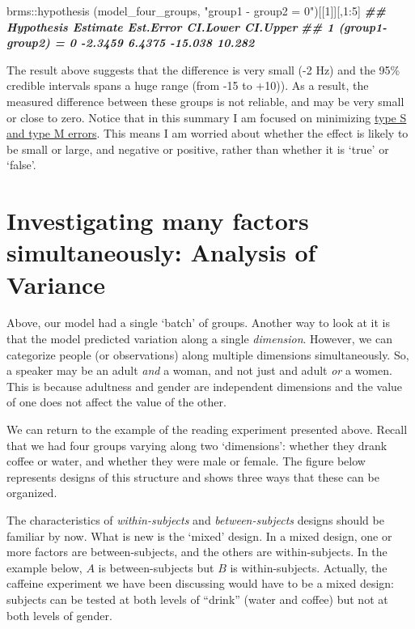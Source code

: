 \documentclass[
]{book}
\newenvironment{Shaded}{\begin{snugshade}}{\end{snugshade}}
\newcommand{\DecValTok}[1]{\textcolor[rgb]{0.00,0.00,0.81}{#1}}
\newcommand{\DocumentationTok}[1]{\textcolor[rgb]{0.56,0.35,0.01}{\textbf{\textit{#1}}}}
\newcommand{\FunctionTok}[1]{\textcolor[rgb]{0.00,0.00,0.00}{#1}}
\newcommand{\NormalTok}[1]{#1}
\newcommand{\SpecialCharTok}[1]{\textcolor[rgb]{0.00,0.00,0.00}{#1}}
\newcommand{\StringTok}[1]{\textcolor[rgb]{0.31,0.60,0.02}{#1}}
\begin{document}
\begin{Shaded}
\begin{Highlighting}[]
\NormalTok{brms}\SpecialCharTok{::}\FunctionTok{hypothesis}\NormalTok{ (model\_four\_groups, }\StringTok{"group1 {-} group2 = 0"}\NormalTok{)[[}\DecValTok{1}\NormalTok{]][,}\DecValTok{1}\SpecialCharTok{:}\DecValTok{5}\NormalTok{]}
\DocumentationTok{\#\#            Hypothesis Estimate Est.Error CI.Lower CI.Upper}
\DocumentationTok{\#\# 1 (group1{-}group2) = 0  {-}2.3459    6.4375  {-}15.038   10.282}
\end{Highlighting}
\end{Shaded}

The result above suggests that the difference is very small (-2 Hz) and the 95\% credible intervals spans a huge range (from -15 to +10)). As a result, the measured difference between these groups is not reliable, and may be very small or close to zero. Notice that in this summary I am focused on minimizing \href{https://statmodeling.stat.columbia.edu/2004/12/29/type_1_type_2_t/}{type S and type M errors}. This means I am worried about whether the effect is likely to be small or large, and negative or positive, rather than whether it is `true' or `false'.

\hypertarget{investigating-many-factors-simultaneously-analysis-of-variance}{%
\section{Investigating many factors simultaneously: Analysis of Variance}\label{investigating-many-factors-simultaneously-analysis-of-variance}}

Above, our model had a single `batch' of groups. Another way to look at it is that the model predicted variation along a single \emph{dimension}. However, we can categorize people (or observations) along multiple dimensions simultaneously. So, a speaker may be an adult \emph{and} a woman, and not just and adult \emph{or} a women. This is because adultness and gender are independent dimensions and the value of one does not affect the value of the other.

We can return to the example of the reading experiment presented above. Recall that we had four groups varying along two `dimensions': whether they drank coffee or water, and whether they were male or female. The figure below represents designs of this structure and shows three ways that these can be organized.

The characteristics of \emph{within-subjects} and \emph{between-subjects} designs should be familiar by now. What is new is the `mixed' design. In a mixed design, one or more factors are between-subjects, and the others are within-subjects. In the example below, \(A\) is between-subjects but \(B\) is within-subjects. Actually, the caffeine experiment we have been discussing would have to be a mixed design: subjects can be tested at both levels of ``drink'' (water and coffee) but not at both levels of gender.
\end{document}
